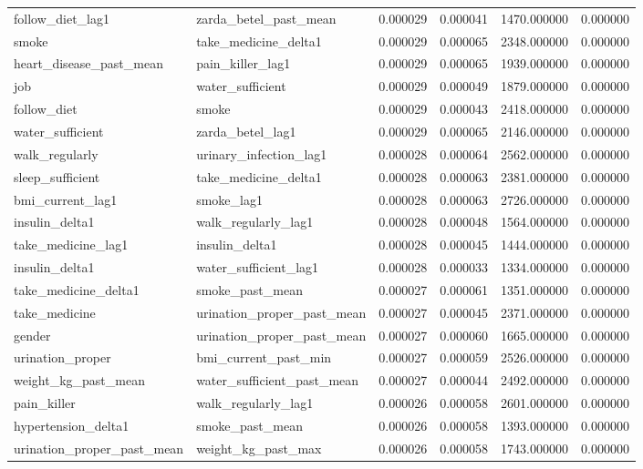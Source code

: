 \begin{longtable}{llrrrr}
follow\_diet\_lag1 & zarda\_betel\_past\_mean & 0.000029 & 0.000041 & 1470.000000 & 0.000000 \\
smoke & take\_medicine\_delta1 & 0.000029 & 0.000065 & 2348.000000 & 0.000000 \\
heart\_disease\_past\_mean & pain\_killer\_lag1 & 0.000029 & 0.000065 & 1939.000000 & 0.000000 \\
job & water\_sufficient & 0.000029 & 0.000049 & 1879.000000 & 0.000000 \\
follow\_diet & smoke & 0.000029 & 0.000043 & 2418.000000 & 0.000000 \\
water\_sufficient & zarda\_betel\_lag1 & 0.000029 & 0.000065 & 2146.000000 & 0.000000 \\
walk\_regularly & urinary\_infection\_lag1 & 0.000028 & 0.000064 & 2562.000000 & 0.000000 \\
sleep\_sufficient & take\_medicine\_delta1 & 0.000028 & 0.000063 & 2381.000000 & 0.000000 \\
bmi\_current\_lag1 & smoke\_lag1 & 0.000028 & 0.000063 & 2726.000000 & 0.000000 \\
insulin\_delta1 & walk\_regularly\_lag1 & 0.000028 & 0.000048 & 1564.000000 & 0.000000 \\
take\_medicine\_lag1 & insulin\_delta1 & 0.000028 & 0.000045 & 1444.000000 & 0.000000 \\
insulin\_delta1 & water\_sufficient\_lag1 & 0.000028 & 0.000033 & 1334.000000 & 0.000000 \\
take\_medicine\_delta1 & smoke\_past\_mean & 0.000027 & 0.000061 & 1351.000000 & 0.000000 \\
take\_medicine & urination\_proper\_past\_mean & 0.000027 & 0.000045 & 2371.000000 & 0.000000 \\
gender & urination\_proper\_past\_mean & 0.000027 & 0.000060 & 1665.000000 & 0.000000 \\
urination\_proper & bmi\_current\_past\_min & 0.000027 & 0.000059 & 2526.000000 & 0.000000 \\
weight\_kg\_past\_mean & water\_sufficient\_past\_mean & 0.000027 & 0.000044 & 2492.000000 & 0.000000 \\
pain\_killer & walk\_regularly\_lag1 & 0.000026 & 0.000058 & 2601.000000 & 0.000000 \\
hypertension\_delta1 & smoke\_past\_mean & 0.000026 & 0.000058 & 1393.000000 & 0.000000 \\
urination\_proper\_past\_mean & weight\_kg\_past\_max & 0.000026 & 0.000058 & 1743.000000 & 0.000000 \\

\end{longtable}
